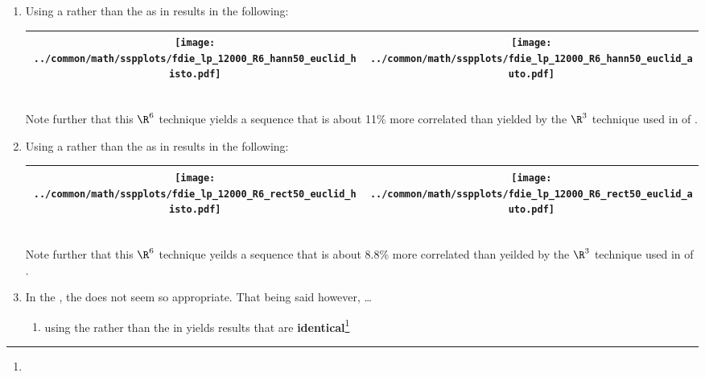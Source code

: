 \begin{example}
\begin{enumerate}
  \item \label{item:fdie_lp_R6_hann50_euclid}
        Using a  rather than the 
         as in 
        results in the following: %
     \\\begin{tabular}{|>{\scs}c|>{\scs}c|}
          \hline
          \texttt{[image: ../common/math/sspplots/fdie\_lp\_12000\_R6\_hann50\_euclid\_histo.pdf]}%
         &\texttt{[image: ../common/math/sspplots/fdie\_lp\_12000\_R6\_hann50\_euclid\_auto.pdf]}
        \\\hline
     \end{tabular}\\
     Note further that this $\R^6$ technique yields a sequence that is about 11\% more correlated than 
     yielded by the $\R^3$ technique
     used in  of .

  \item \label{item:fdie_lp_R6_rect50_euclid}
        Using a  rather than the 
         as in 
        results in the following: %
     \\\begin{tabular}{|>{\scs}c|>{\scs}c|}
          \hline
          \texttt{[image: ../common/math/sspplots/fdie\_lp\_12000\_R6\_rect50\_euclid\_histo.pdf]}%
         &\texttt{[image: ../common/math/sspplots/fdie\_lp\_12000\_R6\_rect50\_euclid\_auto.pdf]}
        \\\hline
     \end{tabular}\\
     Note further that this $\R^6$ technique yeilds a sequence that is about 8.8\% more correlated than yeilded by the $\R^3$ technique
     used in  of .

  \item In the , the  does not seem so appropriate.
        That being said however, \ldots 
    \begin{enumerate}
      \item using the  rather than the  in 
             yields results that are 
            \textbf{identical}\footnote{} %


\end{enumerate}
\end{enumerate}
\end{example}
